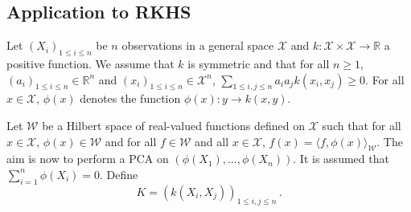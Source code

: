 \documentclass[a4paper,10pt,fleqn]{article}
\newcommand{\eqsp}{\,}
\newcommand{\rset}{\ensuremath{\mathbb{R}}}
\newcommand{\W}{\ensuremath{\mathcal{W}}}
\newcommand{\X}{\ensuremath{\mathcal{X}}}
\newcommand{\1}{\ensuremath{\mathbbm{1}}}
\newcommand{\bfK}{K}
\begin{document}
\subsection*{Application to RKHS}
Let $(X_i)_{1\le i \le n}$ be $n$ observations in a general space $\X$ and $k: \X\times \X \to \rset$ a positive function. We assume that $k$ is symmetric and that for all $n\geqslant 1$, $(a_i)_{1\leqslant i \leqslant n}\in\rset^n$ and $(x_i)_{1\leqslant i \leqslant n}\in\X^n$, $\sum_{1\leqslant i,j \leqslant n}a_ia_j k(x_i,x_j)\geqslant 0$.  For all $x\in\X$, $\phi(x)$ denotes the function $\phi(x): y\to k(x,y)$.

Let $\W$ be a Hilbert space of real-valued functions defined on $\X$ such that for all $x\in\X$, $\phi(x)\in\W$ and for all $f\in \W$ and all $x\in\X$, $f(x) = \langle f,\phi(x) \rangle_{\W}$. The aim is now to perform a PCA on $(\phi(X_1),\ldots,\phi(X_n))$. It is assumed that $\sum_{i=1}^n \phi(X_i) = 0$. Define
$$
\bfK = \left(k(X_i,X_j)\right)_{1\leqslant i,j \leqslant n}\eqsp.
$$
\end{document}
